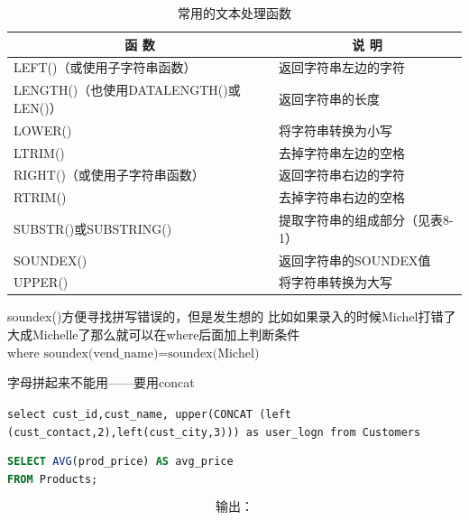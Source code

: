 \begin{table}[htbp]
    \centering
    \caption{常用的文本处理函数}
    \begin{tabular}{lp{8cm}}
        \toprule
        \multicolumn{1}{c}{\textbf{函 数}} & \multicolumn{1}{c}{\textbf{说 明}} \\
        \midrule
        LEFT()（或使用子字符串函数） & 返回字符串左边的字符 \\
        LENGTH()（也使用DATALENGTH()或LEN()） & 返回字符串的长度 \\
        LOWER() & 将字符串转换为小写 \\
        LTRIM() & 去掉字符串左边的空格 \\
        RIGHT()（或使用子字符串函数） & 返回字符串右边的字符 \\
        RTRIM() & 去掉字符串右边的空格 \\
        SUBSTR()或SUBSTRING() & 提取字符串的组成部分（见表8-1） \\
        SOUNDEX() & 返回字符串的SOUNDEX值 \\
        UPPER() & 将字符串转换为大写 \\
        \bottomrule
    \end{tabular}
\end{table}

\begin{dxtips}
soundex()方便寻找拼写错误的，但是发生想的 比如如果录入的时候Michel打错了大成Michelle了那么就可以在where后面加上判断条件\(\text{where soundex(vend\_name)=soundex(Michel)}\)
\end{dxtips}

字母拼起来不能用——要用concat

\begin{dxtips}
    \texttt{select cust\_id,cust\_name, upper(CONCAT (left (cust\_contact,2),left(cust\_city,3))) as user\_logn from Customers}
\end{dxtips}

\begin{lstlisting}[language=SQL]
SELECT AVG(prod_price) AS avg_price
FROM Products;
\end{lstlisting}

\[
\text{输出：}
\]

